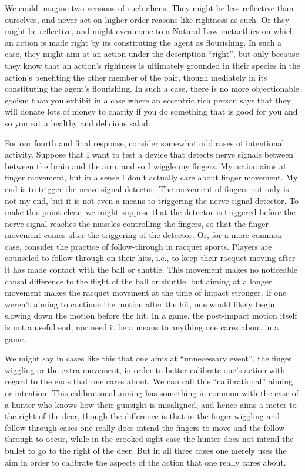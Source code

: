 We could imagine two versions of such aliens. They might be less reflective
than ourselves, and never act on higher-order reasons like rightness as such. Or they might be reflective, and might even come to
a Natural Law metaethics on which an action is made right by its constituting the agent as flourishing. In such a case, they might
aim at an action under the description ``right'', but only because they know that an action's rightness is ultimately grounded in their 
species in the action's benefiting the other member of the pair, though mediately in its constituting the agent's flourishing. 
In such a case, there is no more objectionable egoism than you exhibit in a case where an eccentric rich person says that they
will donate lots of money to charity if you do something that is good for you and so you eat a healthy and delicious salad. 

For our fourth and final response, consider somewhat odd cases of intentional activity. Suppose that
I want to test a device that detects nerve signals between between the brain and the arm, and so I wiggle my fingers. My action aims
at finger movement, but in a sense I don't actually care about finger movement. My end is to trigger the nerve signal detector.
The movement of fingers not only is not my end, but it is not even a means to triggering the nerve signal detector. To make this
point clear, we might suppose that the detector is triggered before the nerve signal reaches the muscles controlling the fingers,
so that the finger movement comes after the triggering of the detector. Or, for a more common case, consider the practice of
follow-through in racquet sports. Players are counseled to follow-through on their hits, i.e., to keep their racquet moving after 
it has made contact with the ball or shuttle. This movement makes no noticeable causal difference to the flight of the ball or 
shuttle, but aiming at a longer movement makes the racquet movement at the time of impact stronger. If one weren't aiming to continue 
the motion after the hit, one would likely begin slowing down the motion before the hit. In a game, the post-impact motion itself is not 
a useful end, nor need it be a means to anything one cares about in a game.

We might say in cases like this that one aims at ``unnecessary event'', the finger wiggling or the extra movement, in order to 
better calibrate one's action with regard to the ends that one cares about. We can call this ``calibrational'' aiming or
intention. This calibrational aiming has something in common with the case of a hunter who knows how their gunsight is misaligned,
and hence aims a meter to the right of the deer, though the difference is that in the finger wiggling and follow-through
cases one really does intend the fingers to move and the follow-through to occur, while in the crooked sight case the hunter does
not intend the bullet to go to the right of the deer. But in all three cases one merely uses the aim in order to calibrate the 
aspects of the action that one really cares about. 

